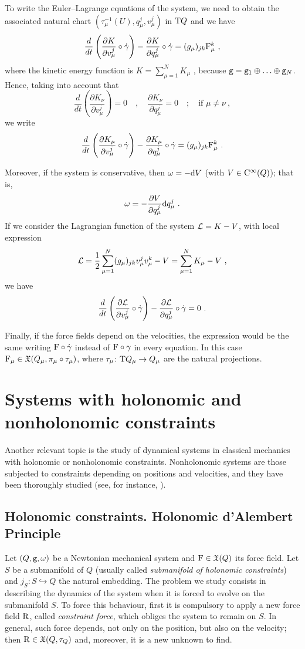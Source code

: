 \documentclass[12pt]{report}
\def\dst{\displaystyle}
\def\derpar#1#2{\frac{\partial{#1}}{\partial{#2}}}
\def\vf{\mathfrak X}
\def\Lag{{\cal L}}
\def\d{{\rm d}}
\def\Tan{{\rm T}}
\def\Cinfty{{\rm C}^\infty}
\begin{document}
To write the Euler--Lagrange equations of the system,
we need to obtain the associated natural chart $(\tau^{-1}_\mu (U),q_\mu^j,v_\mu^j)$
in $\Tan Q$ and we have
$$
\frac{d}{d t}\left(\derpar{K}{v^j_\mu}\circ\dot\gamma\right)-
\derpar{K}{q^j_\mu}\circ\dot\gamma=
( g_\mu)_{jk}{\rm F}_\mu^k \ ,
$$
where the kinetic energy function is \(\dst K=\sum_{\mu=1}^NK_\mu\) ,
because ${\tt g}={\tt g}_1\oplus\ldots\oplus {\tt g}_N$. Hence, taking into account that
$$
\frac{d}{d t}\left(\derpar{K_\nu}{v^j_\mu}\right)= 0 \quad , \quad
\derpar{K_\nu}{q^j_\mu}=0 \quad ;\quad \mbox{if $\mu\not=\nu$} \ ,
$$
we write
$$
\frac{d}{d t}\left(\derpar{K_\mu}{v^j_\mu}\circ\dot\gamma\right)-
\derpar{K_\mu}{q^j_\mu}\circ\dot\gamma=
(g_\mu)_{jk}{\rm F}_\mu^k \ .
$$

Moreover, if the system is conservative, then $\omega=-\d V$ (with $V\in\Cinfty (Q)$);
that is,
$$
\omega=-\derpar{V}{q^j_\mu}\d q^j_\mu \ .
$$
If we consider the Lagrangian function of the system $\Lag=K-V$,
with local expression
$$
\Lag =\frac{1}{2}\sum_{\mu=1}^N(g_\mu)_{jk}v^j_\mu v^k_\mu-V=
\sum_{\mu=1}^NK_\mu-V \ ,
$$
we have
$$
\frac{d}{d t}\left(\derpar{\Lag}{v^j_\mu}\circ\dot\gamma\right)-
\derpar{\Lag}{q^j_\mu}\circ\dot\gamma=0 \ .
$$

Finally, if the force fields depend on the velocities, the expression would be the same writing ${\rm F}\circ\dot\gamma$ instead of ${\rm F}\circ\gamma$ in every equation. In this case
${\rm F}_\mu\in\vf (Q_\mu,\pi_\mu\circ\tau_\mu)$, where
$\tau_\mu\colon \Tan Q_{\mu}\to Q_\mu$ are the natural projections.


\section{Systems with holonomic and nonholonomic constraints}
\protect\label{sdnlh}


Another relevant topic is the study of dynamical systems in classical mechanics
with holonomic or nonholonomic constraints.
Nonholonomic systems are those subjected to constraints depending on positions and velocities, and
they  have been thoroughly studied 
(see, for instance,
\cite{Ar-89,Bli,CLMM-2002,LMM,LM-96,Els,Ga-70,Lewis2020,MCL-2000,Neimark-Fufaev,Ve}).


\subsection{Holonomic constraints. Holonomic d'Alembert Principle}


Let $(Q,{\tt g},\omega)$ be a Newtonian mechanical system and ${\rm F}\in\vf (Q)$
its force field. Let $S$ be a submanifold of $Q$
(usually called {\sl submanifold of holonomic constraints}) and
$j_S\colon S\hookrightarrow Q$ the natural embedding. 
The problem we study consists in describing the dynamics of the system when it is forced to evolve on the submanifold $S$.
To force this behaviour, first it is compulsory to apply a new force field ${\rm R}$, called {\sl constraint force}, which obliges the system to remain on $S$.
In general, such force depends, not only on the position, but also on the velocity; 
then ${\rm R}\in\vf (Q,\tau_Q)$ and, moreover, it is a new unknown to find.
\end{document}
